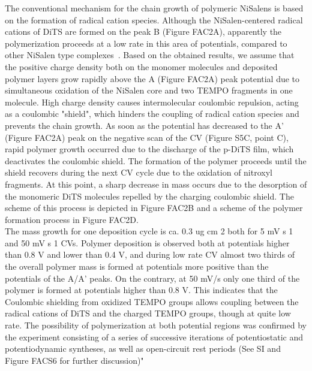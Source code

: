 The conventional mechanism for the chain growth of polymeric NiSalens is based on the formation of radical cation
species. Although the NiSalen-centered radical cations of DiTS
are formed on the peak B (Figure FAC2A), apparently the polymerization proceeds at a low rate in this area of potentials, compared to other NiSalen type complexes~\cite{Novozhilova_2009}. Based on the
obtained results, we assume that the positive charge density both on the monomer molecules and deposited polymer layers grow rapidly above the A (Figure FAC2A) peak potential due to simultaneous oxidation of the NiSalen core and two TEMPO fragments in one molecule. High charge density causes intermolecular coulombic repulsion, acting as a coulombic "shield", which hinders the coupling of radical cation species and prevents the chain growth. As soon as the potential has decreased to the A' (Figure FAC2A) peak on the negative scan of the CV (Figure S5C, point C), rapid polymer growth occurred due to the discharge of the p-DiTS film, which deactivates the
coulombic shield. The formation of the polymer proceeds until the shield recovers during the next CV cycle due to the oxidation of nitroxyl fragments. At this point, a sharp decrease in mass occurs due to the desorption of the monomeric DiTS molecules repelled by the charging coulombic shield. The scheme of this process is depicted in Figure FAC2B and a scheme of the polymer formation process in Figure FAC2D.\\ 

The mass growth for one deposition cycle is ca. 0.3 ug cm 2 both for 5 mV s 1 and 50 mV s 1 CVs. Polymer deposition is observed both at potentials higher than 0.8 V and lower than 0.4 V, and during low rate CV almost two thirds of the overall polymer mass is formed at potentials more positive than the potentials of the
A/A' peaks. On the contrary, at 50 mV/s only one third of the polymer is formed at potentials higher than 0.8 V. This indicates that the Coulombic shielding from oxidized TEMPO groups allows coupling between the radical cations of DiTS and the charged TEMPO groups, though at quite low rate. The
possibility of polymerization at both potential regions was confirmed by the experiment consisting of a series of
successive iterations of potentiostatic and potentiodynamic syntheses, as well as open-circuit rest periods (See SI and Figure FACS6 for further discussion)"

